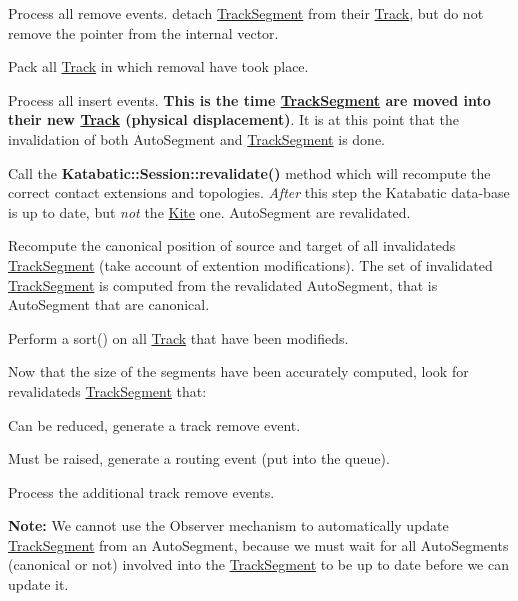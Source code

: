 \begin{DoxyItemize}
\item Process all remove events. detach \hyperlink{classKite_1_1TrackSegment}{Track\+Segment} from their \hyperlink{classKite_1_1Track}{Track}, but do not remove the pointer from the internal {\ttfamily vector}.
\item Pack all \hyperlink{classKite_1_1Track}{Track} in which removal have took place.
\item Process all insert events. {\bfseries This is the time \hyperlink{classKite_1_1TrackSegment}{Track\+Segment} are moved into their new \hyperlink{classKite_1_1Track}{Track} (physical displacement)}. It is at this point that the invalidation of both Auto\+Segment and \hyperlink{classKite_1_1TrackSegment}{Track\+Segment} is done.
\item Call the \textbf{ Katabatic\+::\+Session\+::revalidate()} method which will recompute the correct contact extensions and topologies. {\itshape After} this step the Katabatic data-\/base is up to date, but {\itshape not} the \hyperlink{namespaceKite}{Kite} one. Auto\+Segment are revalidated.
\item Recompute the canonical position of source and target of all invalidateds \hyperlink{classKite_1_1TrackSegment}{Track\+Segment} (take account of extention modifications). The set of invalidated \hyperlink{classKite_1_1TrackSegment}{Track\+Segment} is computed from the revalidated Auto\+Segment, that is Auto\+Segment that are canonical.
\item Perform a sort() on all \hyperlink{classKite_1_1Track}{Track} that have been modifieds.
\item Now that the size of the segments have been accurately computed, look for revalidateds \hyperlink{classKite_1_1TrackSegment}{Track\+Segment} that\+:
\begin{DoxyEnumerate}
\item Can be reduced, generate a track remove event.
\item Must be raised, generate a routing event (put into the queue).
\end{DoxyEnumerate}
\item Process the additional track remove events.
\end{DoxyItemize}

{\bfseries Note\+:} We cannot use the Observer mechanism to automatically update \hyperlink{classKite_1_1TrackSegment}{Track\+Segment} from an Auto\+Segment, because we must wait for all Auto\+Segments (canonical or not) involved into the \hyperlink{classKite_1_1TrackSegment}{Track\+Segment} to be up to date before we can update it.

